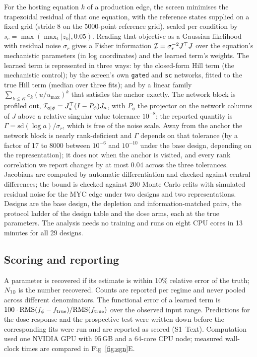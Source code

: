 For the hosting equation $k$ of a production edge, the screen minimises the
trapezoidal residual of that one equation, with the reference states supplied on
a fixed grid (stride 8 on the 5000-point reference grid), scaled per condition by
$s_c=\max(\max_t|z_{k}|,0.05)$. Reading that objective as a Gaussian likelihood
with residual noise $\sigma_r$ gives a Fisher information
$\mathcal{I}=\sigma_r^{-2}J^{\top}J$ over the equation's mechanistic parameters (in log
coordinates) and the learned term's weights. The learned term is represented in
three ways: by the closed-form Hill term (the mechanistic control); by the
screen's own \texttt{gated} and \texttt{sc} networks, fitted to the true Hill
term (median over three fits); and by a linear family
$\sum_{k\le K}c_k(u/u_{\max})^k$ that satisfies the anchor exactly. The
network block is profiled out, $\mathcal{I}_{a\mid\phi}=J_a^{\top}(I-P_\phi)J_a$, with
$P_\phi$ the projector on the network columns of $J$ above a relative singular
value tolerance $10^{-8}$; the reported quantity is $\Gamma=\mathrm{sd}(\log a)/\sigma_r$,
which is free of the noise scale. Away from the anchor the network block is
nearly rank-deficient and $\Gamma$ depends on that tolerance (by a factor of 17 to 8000
between $10^{-6}$ and $10^{-10}$ under the base design, depending on the
representation); it does not when the anchor is visited, and every rank correlation we
report changes by at most 0.04 across the three tolerances. Jacobians are
computed by automatic differentiation and checked against central differences;
the bound is checked against 200 Monte Carlo refits with simulated residual
noise for the MYC edge under two designs and two representations. Designs are
the base design, the depletion and information-matched pairs, the protocol
ladder of the design table and the dose arms, each at the true parameters. The
analysis needs no training and runs on eight CPU cores in 13 minutes for all 29 designs.

\subsection{Scoring and reporting}

A parameter is recovered if its estimate is within 10\% relative error of the
truth; $N_{10}$ is the number recovered. Counts are reported per regime and
never pooled across different denominators. The functional error of a learned
term is $100\cdot\mathrm{RMS}(f_{\phi}-f_{\text{true}})/\mathrm{RMS}(f_{\text{true}})$
over the observed input range. Predictions for the dose-response and the
prospective test were written down before the corresponding fits were run and
are reported as scored (S1~Text). Computation used one NVIDIA GPU with 95\,GB
and a 64-core CPU node; measured wall-clock times are compared in
Fig~\ref{fig:sgn}E.
